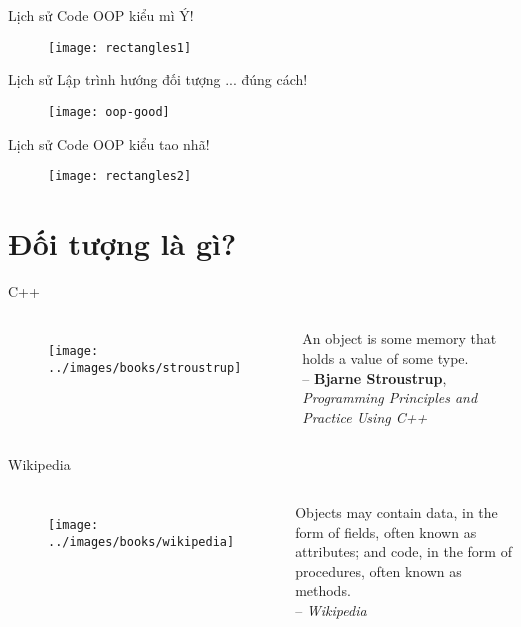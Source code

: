 \documentclass{beamer}
\begin{document}
\begin{frame}{Lịch sử}
    \Large Code OOP kiểu mì Ý!
    \begin{figure}
        \centering
        \texttt{[image: rectangles1]}
    \end{figure}
\end{frame}

\begin{frame}{Lịch sử}
    \Large Lập trình hướng đối tượng ... đúng cách!
    \begin{figure}
        \centering
        \texttt{[image: oop-good]}
    \end{figure}
\end{frame}

\begin{frame}{Lịch sử}
    \Large Code OOP kiểu tao nhã!
    \begin{figure}
        \centering
        \texttt{[image: rectangles2]}
    \end{figure}
\end{frame}

\section{Đối tượng là gì?}

\begin{frame}{C++}
    \begin{columns}
        \begin{figure}
            \centering
            \texttt{[image: ../images/books/stroustrup]}
        \end{figure}
        An object is some memory that holds a value of some type.\\
        -- \textbf{Bjarne Stroustrup}, \emph{Programming Principles and Practice Using C++}
    \end{columns}
\end{frame}

\begin{frame}{Wikipedia}
    \begin{columns}
        \begin{figure}
            \centering
            \texttt{[image: ../images/books/wikipedia]}
        \end{figure}
        Objects may contain data, in the form of fields, often known
        as attributes; and code, in the form of procedures,
        often known as methods.\\
        -- \emph{Wikipedia}
    \end{columns}
\end{frame}
\end{document}
